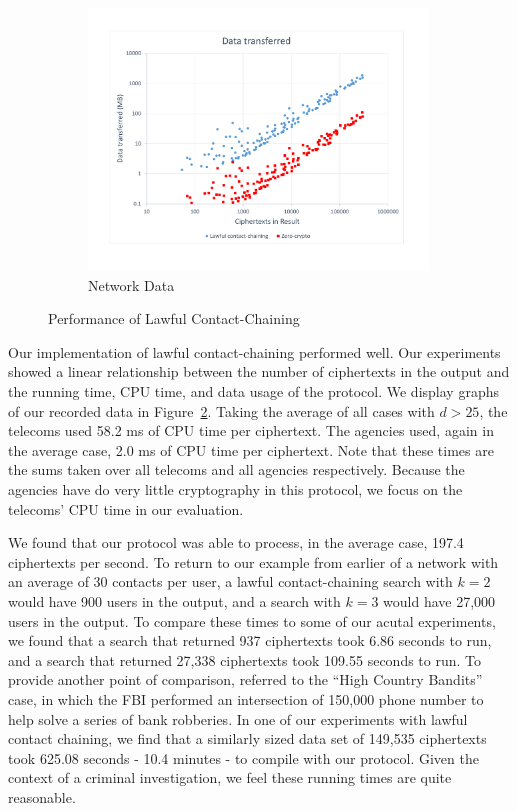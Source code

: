 \begin{figure}[t]
\begin{subfigure}{.33\textwidth}
\centering
\includegraphics[width=0.99\textwidth]{bandwidth.pdf}
\captionsetup{justification=centering}
\caption{Network Data}
\label{fig:data}
\end{subfigure}
\captionsetup{justification=centering}
\caption{Performance of Lawful Contact-Chaining}
\label{fig:performance}
\end{figure}



Our implementation of lawful contact-chaining performed well. Our experiments showed a linear relationship between the number of ciphertexts in the output and the running time, CPU time, and data usage of the protocol. We display graphs of our recorded data in Figure~\ref{fig:performance}. Taking the average of all cases with $d>25$, the telecoms used 58.2 ms of CPU time per ciphertext. The agencies used, again in the average case, 2.0 ms of CPU time per ciphertext. Note that these times are the sums taken over all telecoms and all agencies respectively. Because the agencies have do very little cryptography in this protocol, we focus on the telecoms' CPU time in our evaluation. 

We found that our protocol was able to process, in the average case, 197.4 ciphertexts per second. To return to our example from earlier of a network with an average of 30 contacts per user, a lawful contact-chaining search with $k=2$ would have 900 users in the output, and a search with $k=3$ would have 27,000 users in the output. To compare these times to some of our acutal experiments, we found that a search that returned 937 ciphertexts took 6.86 seconds to run, and a search that returned 27,338 ciphertexts took 109.55 seconds to run. To provide another point of comparison, \cite{sff-foci2014} referred to the ``High Country Bandits'' case, in which the FBI performed an intersection of 150,000 phone number to help solve a series of bank robberies. In one of our experiments with lawful contact chaining, we find that a similarly sized data set of 149,535 ciphertexts took 625.08 seconds - 10.4 minutes - to compile with our protocol. Given the context of a criminal investigation, we feel these running times are quite reasonable. 

